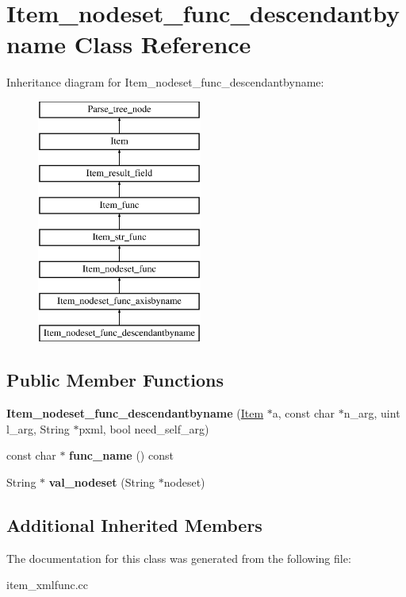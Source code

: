\hypertarget{classItem__nodeset__func__descendantbyname}{}\section{Item\+\_\+nodeset\+\_\+func\+\_\+descendantbyname Class Reference}
\label{classItem__nodeset__func__descendantbyname}
Inheritance diagram for Item\+\_\+nodeset\+\_\+func\+\_\+descendantbyname\+:\begin{figure}[H]
\begin{center}
\leavevmode
\includegraphics[height=8.000000cm]{classItem__nodeset__func__descendantbyname}
\end{center}
\end{figure}
\subsection*{Public Member Functions}
\begin{DoxyCompactItemize}
\item 
\mbox{\label{classItem__nodeset__func__descendantbyname_ab699b1229a8c8881cbf8953fce747846}} 
{\bfseries Item\+\_\+nodeset\+\_\+func\+\_\+descendantbyname} (\mbox{\hyperlink{classItem}{Item}} $\ast$a, const char $\ast$n\+\_\+arg, uint l\+\_\+arg, String $\ast$pxml, bool need\+\_\+self\+\_\+arg)
\item 
\mbox{\label{classItem__nodeset__func__descendantbyname_a7d3beede7e3ab0e29e9c9d48e672e980}} 
const char $\ast$ {\bfseries func\+\_\+name} () const
\item 
\mbox{\label{classItem__nodeset__func__descendantbyname_ac06310b58ea56f980909e3856217b325}} 
String $\ast$ {\bfseries val\+\_\+nodeset} (String $\ast$nodeset)
\end{DoxyCompactItemize}
\subsection*{Additional Inherited Members}


The documentation for this class was generated from the following file\+:\begin{DoxyCompactItemize}
\item 
item\+\_\+xmlfunc.\+cc\end{DoxyCompactItemize}
